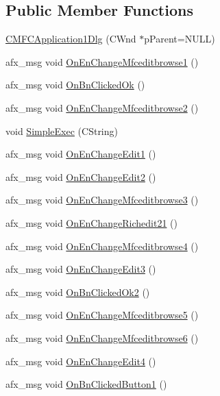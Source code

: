 \subsection*{Public Member Functions}
\begin{DoxyCompactItemize}
\item 
\hyperlink{class_c_m_f_c_application1_dlg_ad8ca88d81c8c1aa30dd9c0b5554d71db}{C\+M\+F\+C\+Application1\+Dlg} (C\+Wnd $\ast$p\+Parent=N\+U\+L\+L)
\item 
afx\+\_\+msg void \hyperlink{class_c_m_f_c_application1_dlg_aad89f83f0246461b93c0377d97408b09}{On\+En\+Change\+Mfceditbrowse1} ()
\item 
afx\+\_\+msg void \hyperlink{class_c_m_f_c_application1_dlg_a13c23b4dd2c2c89a6970e0af6982eb12}{On\+Bn\+Clicked\+Ok} ()
\item 
afx\+\_\+msg void \hyperlink{class_c_m_f_c_application1_dlg_a864098e0a14a11978955575725af1fa6}{On\+En\+Change\+Mfceditbrowse2} ()
\item 
void \hyperlink{class_c_m_f_c_application1_dlg_a04e6cd2f9bff6aa93e6c6e090ca4be5b}{Simple\+Exec} (C\+String)
\item 
afx\+\_\+msg void \hyperlink{class_c_m_f_c_application1_dlg_aac1ef6340c91bdffc251e1b5fe353414}{On\+En\+Change\+Edit1} ()
\item 
afx\+\_\+msg void \hyperlink{class_c_m_f_c_application1_dlg_a8386dddff3ab69cac2b651c26f1a68f0}{On\+En\+Change\+Edit2} ()
\item 
afx\+\_\+msg void \hyperlink{class_c_m_f_c_application1_dlg_ae0229117f7cb2c4363b077a790cd5b23}{On\+En\+Change\+Mfceditbrowse3} ()
\item 
afx\+\_\+msg void \hyperlink{class_c_m_f_c_application1_dlg_af63b8be9d67db5cc7f227d243e8b3317}{On\+En\+Change\+Richedit21} ()
\item 
afx\+\_\+msg void \hyperlink{class_c_m_f_c_application1_dlg_ab7a0e73a0cc0a91a1cb79c67c5c329f1}{On\+En\+Change\+Mfceditbrowse4} ()
\item 
afx\+\_\+msg void \hyperlink{class_c_m_f_c_application1_dlg_a0f9329b166a7f5d3779695dcc5dd4a3a}{On\+En\+Change\+Edit3} ()
\item 
afx\+\_\+msg void \hyperlink{class_c_m_f_c_application1_dlg_a6c63ee788bec482b05931ce2b945c76c}{On\+Bn\+Clicked\+Ok2} ()
\item 
afx\+\_\+msg void \hyperlink{class_c_m_f_c_application1_dlg_a9958dece47e75d4d8c0230a90941e05f}{On\+En\+Change\+Mfceditbrowse5} ()
\item 
afx\+\_\+msg void \hyperlink{class_c_m_f_c_application1_dlg_a23df870ad470c42454f545248416c5fd}{On\+En\+Change\+Mfceditbrowse6} ()
\item 
afx\+\_\+msg void \hyperlink{class_c_m_f_c_application1_dlg_a9f8a264b6ee84fccce46158ecf14b355}{On\+En\+Change\+Edit4} ()
\item 
afx\+\_\+msg void \hyperlink{class_c_m_f_c_application1_dlg_a5f1b609b65795606fced274265addc28}{On\+Bn\+Clicked\+Button1} ()
\end{DoxyCompactItemize}
